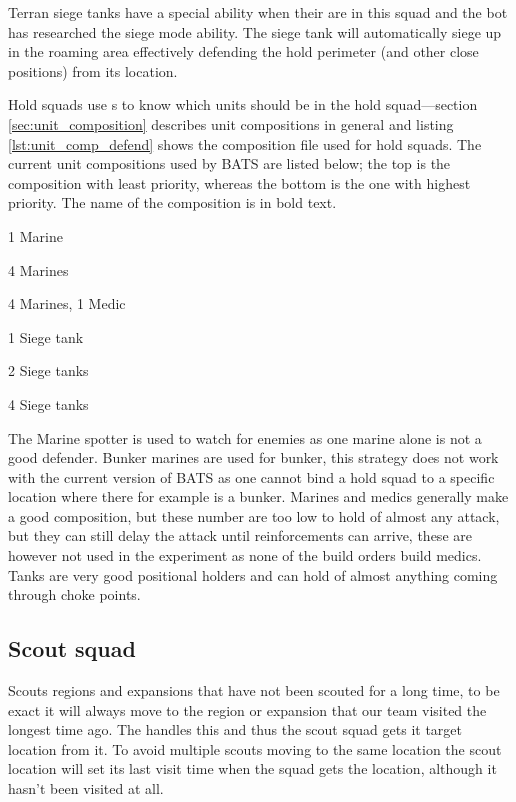 Terran siege tanks have a special ability when their are in this squad and the bot has researched the siege mode ability. The siege tank will automatically siege up in the roaming area effectively defending the hold perimeter (and other close positions) from its location.

Hold squads use s to know which units should be in the hold squad—section \ref{sec:unit_composition} describes unit compositions in general and listing \ref{lst:unit_comp_defend} shows the composition file used for hold squads. The current unit compositions used by BATS are listed below; the top is the composition with least priority, whereas the bottom is the one with highest priority. The name of the composition is in bold text.

\begin{function_description}
	\item[Marine spotter] 1 Marine
	\item[Bunker Marines] 4 Marines
	\item[Marine Medics] 4 Marines, 1 Medic
	\item[Tanks 1] 1 Siege tank
	\item[Tanks 2] 2 Siege tanks
	\item[Tanks 4] 4 Siege tanks
\end{function_description}
The Marine spotter is used to watch for enemies as one marine alone is not a good defender. Bunker marines are used for bunker, this strategy does not work with the current version of BATS as one cannot bind a hold squad to a specific location where there for example is a bunker. Marines and medics generally make a good composition, but these number are too low to hold of almost any attack, but they can still delay the attack until reinforcements can arrive, these are however not used in the experiment as none of the build orders build medics. Tanks are very good positional holders and can hold of almost anything coming through choke points\cite{day9}.

\subsection{Scout squad}
\label{sec:scout_squad}
Scouts regions and expansions that have not been scouted for a long time, to be exact it will always move to the region or expansion that our team visited the longest time ago. The  handles this and thus the scout squad gets it target location from it. To avoid multiple scouts moving to the same location the scout location will set its last visit time when the squad gets the location, although it hasn't been visited at all.

